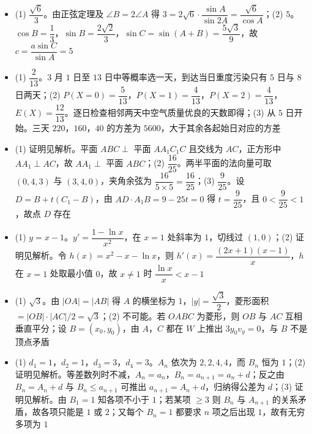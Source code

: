 \begin{itemize}[leftmargin=2.6em]
  \item[\textbf{15.}] (1) $\dfrac{\sqrt6}3$。由正弦定理及 $\angle B=2\angle A$ 得 $3=2\sqrt6\cdot\dfrac{\sin A}{\sin2A}=\dfrac{\sqrt6}{\cos A}$；(2) $5$。$\cos B=\dfrac13$，$\sin B=\dfrac{2\sqrt2}3$，$\sin C=\sin(A+B)=\dfrac{5\sqrt3}9$，故 $c=\dfrac{a\sin C}{\sin A}=5$
  \item[\textbf{16.}] (1) $\dfrac2{13}$。$3$ 月 $1$ 日至 $13$ 日中等概率选一天，到达当日重度污染只有 $5$ 日与 $8$ 日两天；(2) $P(X=0)=\dfrac5{13}$，$P(X=1)=\dfrac4{13}$，$P(X=2)=\dfrac4{13}$，$E(X)=\dfrac{12}{13}$。逐日检查相邻两天中空气质量优良的天数即得；(3) 从 $5$ 日开始。三天 $220$，$160$，$40$ 的方差为 $5600$，大于其余各起始日对应的方差
  \item[\textbf{17.}] (1) 证明见解析。平面 $ABC\perp$ 平面 $AA_1C_1C$ 且交线为 $AC$，正方形中 $AA_1\perp AC$，故 $AA_1\perp$ 平面 $ABC$；(2) $\dfrac{16}{25}$。两半平面的法向量可取 $(0,4,3)$ 与 $(3,4,0)$，夹角余弦为 $\dfrac{16}{5\times5}=\dfrac{16}{25}$；(3) $\dfrac9{25}$。设 $D=B+t(C_1-B)$，由 $AD\cdot A_1B=9-25t=0$ 得 $t=\dfrac9{25}$，且 $0<\dfrac9{25}<1$，故点 $D$ 存在
  \item[\textbf{18.}] (1) $y=x-1$。$y'=\dfrac{1-\ln x}{x^2}$，在 $x=1$ 处斜率为 $1$，切线过 $(1,0)$；(2) 证明见解析。令 $h(x)=x^2-x-\ln x$，则 $h'(x)=\dfrac{(2x+1)(x-1)}x$，$h$ 在 $x=1$ 处取最小值 $0$，故 $x\neq1$ 时 $\dfrac{\ln x}{x}<x-1$
  \item[\textbf{19.}] (1) $\sqrt3$。由 $|OA|=|AB|$ 得 $A$ 的横坐标为 $1$，$|y|=\dfrac{\sqrt3}2$，菱形面积 $=|OB|\cdot|AC|/2=\sqrt3$；(2) 不可能。若 $OABC$ 为菱形，则 $OB$ 与 $AC$ 互相垂直平分；设 $B=(x_0,y_0)$，由 $A$，$C$ 都在 $W$ 上推出 $3y_0v_y=0$，与 $B$ 不是顶点矛盾
  \item[\textbf{20.}] (1) $d_1=1$，$d_2=1$，$d_3=3$，$d_4=3$。$A_n$ 依次为 $2,2,4,4$，而 $B_n$ 恒为 $1$；(2) 证明见解析。等差数列时不减，$A_n=a_n$，$B_n=a_{n+1}=a_n+d$；反之由 $B_n=A_n+d$ 与 $B_n\leqslant a_{n+1}$ 可推出 $a_{n+1}=A_n+d$，归纳得公差为 $d$；(3) 证明见解析。由 $B_1=1$ 知各项不小于 $1$；若某项 $\geqslant3$ 则 $B_n$ 与 $A_{n+1}$ 的关系矛盾，故各项只能是 $1$ 或 $2$；又每个 $B_n=1$ 都要求 $n$ 项之后出现 $1$，故有无穷多项为 $1$
\end{itemize}
